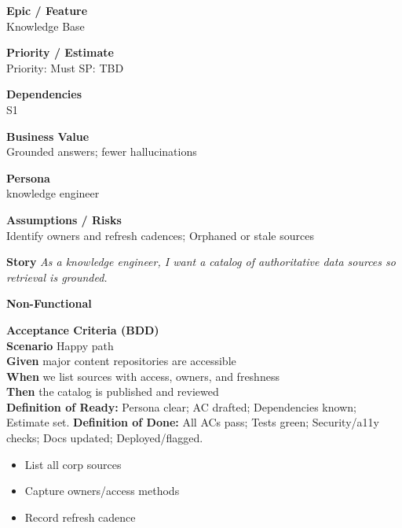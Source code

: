 \documentclass[11pt,a4paper]{article}
\newenvironment{StoryCard}[2][]{
  \begin{tcolorbox}[enhanced, breakable, sharp corners=all, colback=cardback, colframe=cardframe,
    title={#2}, fonttitle=\bfseries\large, boxrule=0.6pt, borderline west={2pt}{0pt}{accent}, #1]
}{
  \end{tcolorbox}
}
\newcommand{\badge}[1]{\pill{\footnotesize #1}}
\newcommand{\cb}{\(\square\)}
\newenvironment{TasksBox}[1][Tasks]{%
  \begin{tcolorbox}[enhanced,breakable,
    colback=cardback, colframe=cardframe, title={#1},
    borderline west={1.8pt}{0pt}{MidnightBlue},
    arc=2pt, boxrule=0.4pt,
    left=10pt,right=10pt,top=6pt,bottom=6pt,
    before skip=6pt, after skip=10pt
  ]
  \small
  \begin{itemize}[label=\cb, leftmargin=*, labelsep=0.6em, itemsep=4pt, topsep=2pt, parsep=0pt]
}{%
  \end{itemize}
  \end{tcolorbox}
}
\begin{document}
\begin{StoryCard}{S4 — Source inventory}
\noindent\begin{minipage}[t]{0.49\textwidth}
\textbf{Epic / Feature}\\
Knowledge Base

\medskip
\textbf{Priority / Estimate}\\
Priority: Must \quad SP: TBD

\medskip
\textbf{Dependencies}\\
S1
\end{minipage}\hfill
\begin{minipage}[t]{0.49\textwidth}
\textbf{Business Value}\\
Grounded answers; fewer hallucinations

\medskip
\textbf{Persona}\\
knowledge engineer

\medskip
\textbf{Assumptions / Risks}\\
Identify owners and refresh cadences; Orphaned or stale sources
\end{minipage}

\medskip
\textbf{Story} \emph{As a knowledge engineer, I want a catalog of authoritative data sources so retrieval is grounded.}

\medskip
\textbf{Non-Functional}
\badge{Reliability}\ \badge{Security}

\medskip
\textbf{Acceptance Criteria (BDD)}\\
\textbf{Scenario} Happy path\\
\textbf{Given} major content repositories are accessible\\
\textbf{When} we list sources with access, owners, and freshness\\
\textbf{Then} the catalog is published and reviewed\\

\medskip
\footnotesize \textbf{Definition of Ready:} Persona clear; AC drafted; Dependencies known; Estimate set.\quad
\textbf{Definition of Done:} All ACs pass; Tests green; Security/a11y checks; Docs updated; Deployed/flagged.
\end{StoryCard}

\begin{TasksBox}[Tasks]
  \item List all corp sources
  \item Capture owners/access methods
  \item Record refresh cadence
\end{TasksBox}
\clearpage
\end{document}
